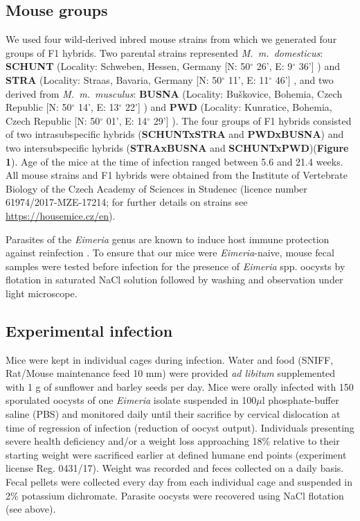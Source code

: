 \documentclass[12pt]{article}
\begin{document}
\subsection{Mouse groups}

We used four wild-derived inbred mouse strains from which we generated four groups of F1 hybrids. Two parental strains represented \textit{M.~m.~domesticus}: \textbf{SCHUNT} (Locality: Schweben, Hessen, Germany [N: 50$ ^{\circ} $ 26’, E: 9$ ^{\circ} $ 36’] \citep{martincova_phenotypic_2019}) and \textbf{STRA} (Locality: Straas, Bavaria, Germany [N: 50$ ^{\circ} $ 11’, E: 11$ ^{\circ} $ 46’] \citep{pialek_development_2008}, and two derived from \textit{M.~m.~musculus}: \textbf{BUSNA} (Locality: Buškovice, Bohemia, Czech Republic [N: 50$ ^{\circ} $ 14’, E: 13$ ^{\circ} $ 22’] \citep{pialek_development_2008}) and \textbf{PWD} (Locality: Kunratice, Bohemia, Czech Republic [N: 50$ ^{\circ} $ 01’, E: 14$ ^{\circ} $ 29’] \citep{gregorova_pwdph_2000}). The four groups of F1 hybrids consisted of two intrasubspecific hybrids (\textbf{SCHUNTxSTRA }and \textbf{PWDxBUSNA}) and two intersubspecific hybrids (\textbf{STRAxBUSNA} and \textbf{SCHUNTxPWD})(\textbf{Figure 1}). Age of the mice at the time of infection ranged between 5.6 and 21.4 weeks. All mouse strains and F1 hybrids were obtained from the Institute of Vertebrate Biology of the Czech Academy of Sciences in Studenec (licence number 61974/2017-MZE-17214; for further details on strains see \url{https://housemice.cz/en}).\par

Parasites of the \textit{Eimeria }genus are known to induce host immune protection against reinfection \citep{rose_immune_1992, smith_genetic_2000}. To ensure that our mice were \textit{Eimeria}-naive, mouse fecal samples were tested before infection for the presence of \textit{Eimeria }spp. oocysts by flotation in saturated NaCl solution followed by washing and observation under light microscope. \par

\subsection{Experimental infection}

Mice were kept in individual cages during infection. Water and food (SNIFF, Rat/Mouse maintenance feed 10 mm) were provided \textit{ad libitum} supplemented with 1 g of sunflower and barley seeds per day. Mice were orally infected with 150 sporulated oocysts of one \textit{Eimeria }isolate suspended in 100$\mu$l phosphate-buffer saline (PBS) and monitored daily until their sacrifice by cervical dislocation at time of regression of infection (reduction of oocyst output). Individuals presenting severe health deficiency and/or a weight loss approaching 18\% relative to their starting weight were sacrificed earlier at defined humane end points (experiment license Reg. 0431/17). Weight was recorded and feces collected on a daily basis. Fecal pellets were collected every day from each individual cage and suspended in 2\% potassium dichromate. Parasite oocysts were recovered using NaCl flotation (see above). \par
\end{document}
